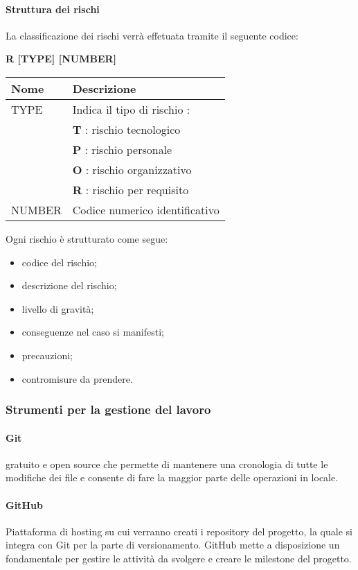 \paragraph{Struttura dei rischi} \hfill \break
La classificazione dei rischi verrà effetuata tramite il seguente codice:
\begin{center}
    \textbf{R [TYPE] [NUMBER]}
\end{center}
\begin{center}
    \renewcommand{\arraystretch}{1.8} %
    \begin{tabular}{ |m{7em}|m{30em}| }
        \hline
        \textbf{Nome} & \textbf{Descrizione} \\
        \hline
        TYPE & Indica il tipo di rischio :\\
             & \textbf{T} : rischio tecnologico\\
             & \textbf{P} : rischio personale\\
             & \textbf{O} : rischio organizzativo\\
             & \textbf{R} : rischio per requisito\\
        \hline
        NUMBER & Codice numerico identificativo\\
        \hline
    \end{tabular}
\end{center}
Ogni rischio è strutturato come segue:
\begin{itemize}
    \item codice del rischio;
    \item descrizione del rischio;
    \item livello di gravità;
    \item conseguenze nel caso si manifesti;
    \item precauzioni;
    \item contromisure da prendere.
\end{itemize}

\subsubsection{Strumenti per la gestione del lavoro}
\paragraph{Git} \hfill \break
{} gratuito e open source che permette di mantenere una cronologia di tutte le 
modifiche dei file e consente di fare la maggior parte delle operazioni in locale.

\paragraph{GitHub} \hfill \break
Piattaforma di hosting su cui verranno creati i repository del progetto, la quale si integra con Git per la 
parte di versionamento. GitHub mette a disposizione un  fondamentale per 
gestire le attività da svolgere e creare le milestone del progetto.